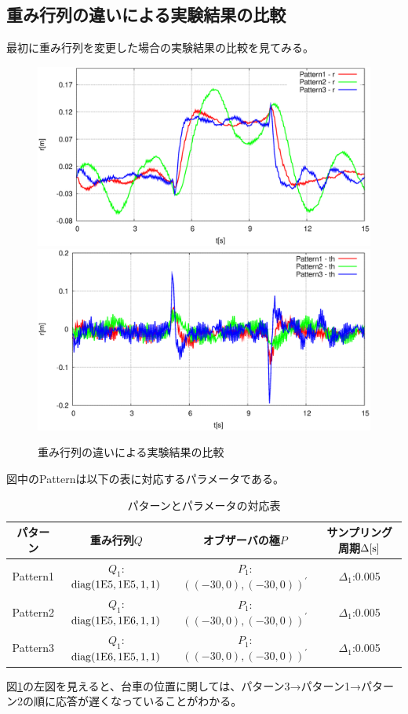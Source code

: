 	\subsection{重み行列の違いによる実験結果の比較}
	最初に重み行列を変更した場合の実験結果の比較を見てみる。
	\begin{figure}[H]
		\centering
		\includegraphics[width=0.49\linewidth]{gazo/Compare_Q_R2.eps}
		\includegraphics[width=0.49\linewidth]{gazo/Compare_Q_TH2.eps}
		\caption{重み行列の違いによる実験結果の比較}
		\label{image:comp_Q}
	\end{figure}
	図中のPatternは以下の表に対応するパラメータである。
	\begin{table}[H]
		\begin{center}
			\caption{パターンとパラメータの対応表}
			\medskip
			
			\begin{tabular}{|c|c|c|c|}\hline
				パターン & 重み行列$Q$ & オブザーバの極$P$ & サンプリング周期$\Delta[\rm{s}]$ \\ \hline\hline
				Pattern1 & $Q_1$:$\rm{diag}(1E5,1E5,1,1)$ & $P_1$:$((-30,0),(-30,0))^{'}$ & $\Delta_1$:0.005 \\ \hline
				Pattern2 & $Q_1$:$\rm{diag}(1E5,1E6,1,1)$ & $P_1$:$((-30,0),(-30,0))^{'}$ & $\Delta_1$:0.005 \\ \hline
				Pattern3 & $Q_1$:$\rm{diag}(1E6,1E5,1,1)$ & $P_1$:$((-30,0),(-30,0))^{'}$ & $\Delta_1$:0.005 \\ \hline
			\end{tabular}
		\end{center}
		\label{table:huriage_control}
	\end{table}
	図\ref{image:comp_Q}の左図を見えると、台車の位置に関しては、パターン3→パターン1→パターン2の順に応答が遅くなっていることがわかる。
